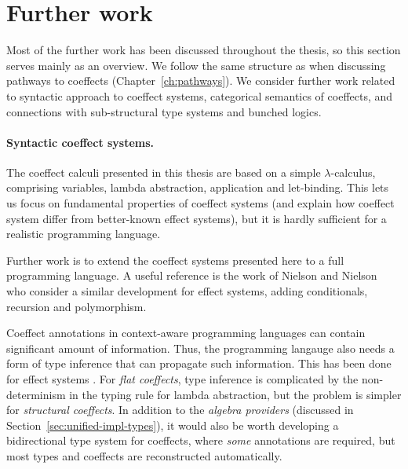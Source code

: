 \section{Further work}
\label{sec:conc-further}

Most of the further work has been discussed throughout the thesis, so this section
serves mainly as an overview. We follow the same structure as when discussing pathways to 
coeffects (Chapter~\ref{ch:pathways}). We consider further work related to syntactic approach
to coeffect systems, categorical semantics of coeffects, and connections with sub-structural type 
systems and bunched logics. 


\paragraph{Syntactic coeffect systems.}
The coeffect calculi presented in this thesis are based on a simple $\lambda$-calculus, comprising
variables, lambda abstraction, application and let-binding. This lets us focus on fundamental
properties of coeffect systems (and explain how coeffect system differ from better-known effect
systems), but it is hardly sufficient for a realistic programming language. 

Further work is to extend the coeffect systems presented here to a full programming language. A
useful reference is the work of Nielson and Nielson~\cite{effects-nielson} who consider a 
similar development for effect systems, adding conditionals, recursion and polymorphism.

Coeffect annotations in context-aware programming languages can contain significant amount
of information. Thus, the programming langauge also needs a form of type inference that can propagate
such information. This has been done for effect systems \cite{effects-polymorphic}. For 
\emph{flat coeffects}, type inference is complicated by the non-determinism in the typing rule
for lambda abstraction, but the problem is simpler for \emph{structural coeffects}. In addition
to the \emph{algebra providers} (discussed in Section~\ref{sec:unified-impl-types}), it would also
be worth developing a bidirectional type system \cite{types-bidirectional} for coeffects, where 
\emph{some} annotations are required, but most types and coeffects are reconstructed automatically.


